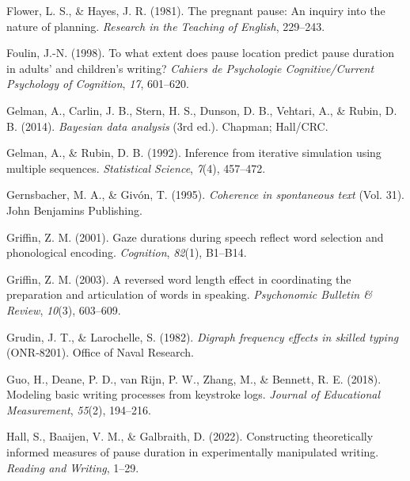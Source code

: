 \documentclass[
  man,floatsintext]{apa7}
\newlength{\cslhangindent}
\newlength{\cslentryspacingunit} %
\newenvironment{CSLReferences}[2] %
 {%
  \setlength{\parindent}{0pt}
  \ifodd #1
  \let\oldpar\par
  \def\par{\hangindent=\cslhangindent\oldpar}
  \fi
  \setlength{\parskip}{#2\cslentryspacingunit}
 }%
 {}
\begin{document}
\begin{CSLReferences}{1}{0}
\leavevmode{}%
Flower, L. S., \& Hayes, J. R. (1981). The pregnant pause: An inquiry into the nature of planning. \emph{Research in the Teaching of English}, 229--243.

\leavevmode{}%
Foulin, J.-N. (1998). To what extent does pause location predict pause duration in adults' and children's writing? \emph{Cahiers de Psychologie Cognitive/Current Psychology of Cognition}, \emph{17}, 601--620.

\leavevmode{}%
Gelman, A., Carlin, J. B., Stern, H. S., Dunson, D. B., Vehtari, A., \& Rubin, D. B. (2014). \emph{Bayesian data analysis} (3rd ed.). Chapman; Hall/CRC.

\leavevmode{}%
Gelman, A., \& Rubin, D. B. (1992). Inference from iterative simulation using multiple sequences. \emph{Statistical Science}, \emph{7}(4), 457--472.

\leavevmode{}%
Gernsbacher, M. A., \& Givón, T. (1995). \emph{Coherence in spontaneous text} (Vol. 31). John Benjamins Publishing.

\leavevmode{}%
Griffin, Z. M. (2001). Gaze durations during speech reflect word selection and phonological encoding. \emph{Cognition}, \emph{82}(1), B1--B14.

\leavevmode{}%
Griffin, Z. M. (2003). A reversed word length effect in coordinating the preparation and articulation of words in speaking. \emph{Psychonomic Bulletin \& Review}, \emph{10}(3), 603--609.

\leavevmode{}%
Grudin, J. T., \& Larochelle, S. (1982). \emph{Digraph frequency effects in skilled typing} (ONR-8201). Office of Naval Research.

\leavevmode{}%
Guo, H., Deane, P. D., van Rijn, P. W., Zhang, M., \& Bennett, R. E. (2018). Modeling basic writing processes from keystroke logs. \emph{Journal of Educational Measurement}, \emph{55}(2), 194--216.

\leavevmode{}%
Hall, S., Baaijen, V. M., \& Galbraith, D. (2022). Constructing theoretically informed measures of pause duration in experimentally manipulated writing. \emph{Reading and Writing}, 1--29.


\end{CSLReferences}
\end{document}
